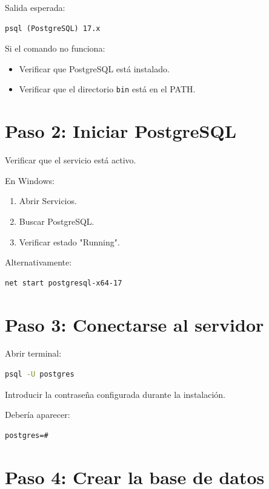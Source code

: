 Salida esperada:

\begin{verbatim}
psql (PostgreSQL) 17.x
\end{verbatim}

Si el comando no funciona:

\begin{itemize}
\item Verificar que PostgreSQL está instalado.
\item Verificar que el directorio \texttt{bin} está en el PATH.
\end{itemize}

\section{Paso 2: Iniciar PostgreSQL}

Verificar que el servicio está activo.

En Windows:

\begin{enumerate}
\item Abrir Servicios.
\item Buscar PostgreSQL.
\item Verificar estado "Running".
\end{enumerate}

Alternativamente:

\begin{lstlisting}[language=bash]
net start postgresql-x64-17
\end{lstlisting}

\section{Paso 3: Conectarse al servidor}

Abrir terminal:

\begin{lstlisting}[language=bash]
psql -U postgres
\end{lstlisting}

Introducir la contraseña configurada durante la instalación.

Debería aparecer:

\begin{verbatim}
postgres=#
\end{verbatim}

\section{Paso 4: Crear la base de datos}

